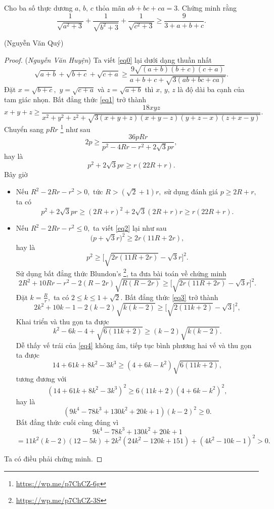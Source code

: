 \documentclass[12pt,a4paper]{book}
\begin{document}
\begin{bt}
Cho ba số thực dương $a,\,b,\,c$ thỏa mãn $ab+bc+ca=3.$ Chứng minh rằng
\begin{equation}\label{eq0}
\frac{1}{\sqrt{a^2+3}}+\frac{1}{\sqrt{b^2+3}}+\frac{1}{\sqrt{c^2+3}} \geqslant \frac{9}{3+a+b+c}.
\end{equation}
\vspace{-1.3cm}
\begin{flushright}(Nguyễn Văn Quý)\end{flushright}
\end{bt}

\begin{proof} (\textit{Nguyễn Văn Huyện}) Ta viết \eqref{eq0} lại dưới dạng thuần nhất
\begin{equation}\label{eq1}
\sqrt{a+b}+\sqrt{b+c}+\sqrt{c+a} \geq \frac{9\sqrt{(a+b)(b+c)(c+a)}}{a+b+c+\sqrt{3(ab+bc+ca)}}.
\end{equation}
Đặt $x=\sqrt{b+c},$ $y = \sqrt{c+a}$ và $z = \sqrt{a+b}$ thì $x,\,y,\,z$ là độ dài ba cạnh của tam giác nhọn. Bất đẳng thức \eqref{eq1} trở thành
\[x+y+z \geqslant \frac{18xyz}{x^2+y^2+z^2+\sqrt{3(x+y+z)(x+y-z)(y+z-x)(z+x-y)}}.\]
Chuyển sang $pRr$ \footnote{\url{https://wp.me/p7ChCZ-6g}} như sau
\[2p \geqslant \frac{36pRr}{p^2-4Rr-r^2+2\sqrt 3 pr},\]
hay là
\begin{equation}\label{eq2}
p^2+2\sqrt 3 pr \geqslant r(22R+r).
\end{equation}
Bây giờ
\begin{itemize}
\item Nếu $R^2-2Rr-r^2 > 0,$ tức $R > (\sqrt 2 + 1)r,$ sử dụng đánh giá $p \geqslant 2R+r,$ ta có
\[p^2+2\sqrt 3 pr \geqslant (2R+r)^2+2\sqrt 3(2R+r)r \geqslant r(22R+r).\]
\item Nếu $R^2-2Rr-r^2 \leqslant 0,$ ta viết \eqref{eq2} lại như sau
\[\big(p+\sqrt 3 r \big)^2 \ge 2r(11R+2r),\]
hay là
\[p^2 \ge \big[\sqrt{2r(11R+2r)}- \sqrt 3 r\big]^2.\]
Sử dụng bất đẳng thức Blundon’s \footnote{\url{https://wp.me/p7ChCZ-3S}}, ta đưa bài toán về chứng minh
\begin{equation}\label{eq3}
2R^2+10Rr-r^2-2(R-2r)\sqrt{R(R-2r)} \ge \big[\sqrt{2r(11R+2r)}- \sqrt 3 r\big]^2.
\end{equation}
Đặt $k = \frac{R}{r},$ ta có $2 \leqslant k \leqslant 1 + \sqrt{2}.$ Bất đẳng thức \eqref{eq3} trở thành
\[2k^2+10k-1-2(k-2)\sqrt{k(k-2)} \geqslant \big[\sqrt{2(11k+2)}-\sqrt 3\big]^2,\]
Khai triển và thu gọn ta được
\begin{equation}\label{eq4}
k^2-6k-4+\sqrt{6(11k+2)} \ge (k-2)\sqrt{k(k-2)}.
\end{equation}
Dễ thấy vế trái của \eqref{eq4} không âm, tiếp tục bình phương hai vế và thu gọn ta được
\[14+61k+8k^2-3k^3 \ge (4+6k-k^2)\sqrt{6(11k+2)},\]
tương đương với
\[(14+61k+8k^2-3k^3)^2 \ge 6(11k+2)(4+6k-k^2)^2,\]
hay là
\[(9k^4-78k^3+130k^2+20k+1)(k-2)^2 \ge 0.\]
Bất đẳng thức cuối cùng đúng vì
\[9k^4-78k^3+130k^2+20k+1\]
\[ = 11k^2(k-2)(12-5k)+2k^2(24k^2-120k+151)+(4k^2-10k-1)^2>0.\]
\end{itemize}
Ta có điều phải chứng minh.
\end{proof}
\end{document}
